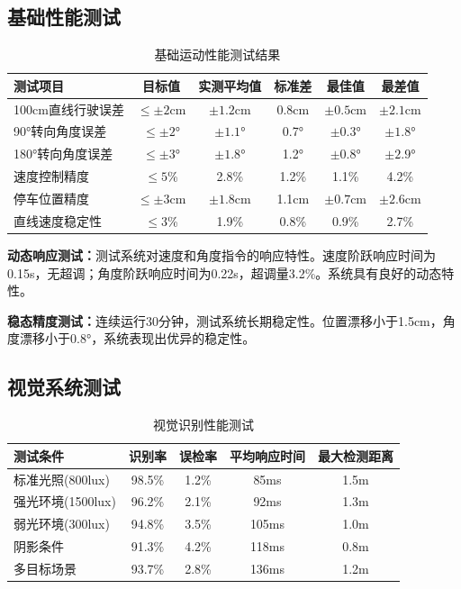 \documentclass[UTF8]{ctexart}
\begin{document}
	\subsection{基础性能测试}
	
	\begin{table}[H]
		\centering
		\caption{基础运动性能测试结果}
		\begin{tabular}{lccccc}
			\toprule
			测试项目 & 目标值 & 实测平均值 & 标准差 & 最佳值 & 最差值 \\
			\midrule
			100cm直线行驶误差 & $\leq \pm 2$cm & $\pm 1.2$cm & 0.8cm & $\pm 0.5$cm & $\pm 2.1$cm \\
			90°转向角度误差 & $\leq \pm 2$° & $\pm 1.1$° & 0.7° & $\pm 0.3$° & $\pm 1.8$° \\
			180°转向角度误差 & $\leq \pm 3$° & $\pm 1.8$° & 1.2° & $\pm 0.8$° & $\pm 2.9$° \\
			速度控制精度 & $\leq 5$\% & 2.8\% & 1.2\% & 1.1\% & 4.2\% \\
			停车位置精度 & $\leq \pm 3$cm & $\pm 1.8$cm & 1.1cm & $\pm 0.7$cm & $\pm 2.6$cm \\
			直线速度稳定性 & $\leq 3$\% & 1.9\% & 0.8\% & 0.9\% & 2.7\% \\
			\bottomrule
		\end{tabular}
	\end{table}
	
	\textbf{动态响应测试：}测试系统对速度和角度指令的响应特性。速度阶跃响应时间为0.15s，无超调；角度阶跃响应时间为0.22s，超调量3.2\%。系统具有良好的动态特性。
	
	\textbf{稳态精度测试：}连续运行30分钟，测试系统长期稳定性。位置漂移小于1.5cm，角度漂移小于0.8°，系统表现出优异的稳定性。
	
	\subsection{视觉系统测试}
	
	\begin{table}[H]
		\centering
		\caption{视觉识别性能测试}
		\begin{tabular}{lcccc}
			\toprule
			测试条件 & 识别率 & 误检率 & 平均响应时间 & 最大检测距离 \\
			\midrule
			标准光照(800lux) & 98.5\% & 1.2\% & 85ms & 1.5m \\
			强光环境(1500lux) & 96.2\% & 2.1\% & 92ms & 1.3m \\
			弱光环境(300lux) & 94.8\% & 3.5\% & 105ms & 1.0m \\
			阴影条件 & 91.3\% & 4.2\% & 118ms & 0.8m \\
			多目标场景 & 93.7\% & 2.8\% & 136ms & 1.2m \\
			\bottomrule
		\end{tabular}
	\end{table}
	
\end{document}
